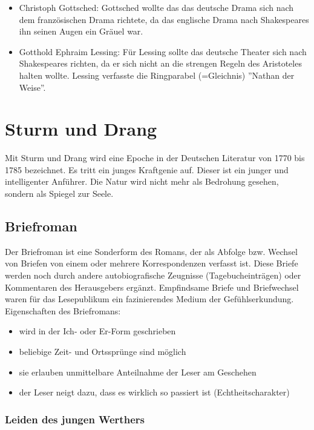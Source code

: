 \documentclass[12pt,a4paper]{article}
\begin{document}
\begin{itemize}
\item Christoph Gottsched: Gottsched wollte das das deutsche Drama sich nach dem französischen Drama richtete, da das englische Drama nach Shakespeares ihn seinen Augen ein Gräuel war. 


\item Gotthold Ephraim Lessing: Für Lessing sollte das deutsche Theater sich nach Shakespeares richten, da er sich nicht an die strengen Regeln des Aristoteles halten wollte. Lessing verfasste die Ringparabel (=Gleichnis) ''Nathan der Weise''.
\end{itemize}

\newpage

\section{Sturm und Drang}

Mit Sturm und Drang wird eine Epoche in der Deutschen Literatur von 1770 bis 1785 bezeichnet. Es tritt ein junges Kraftgenie auf. Dieser ist ein junger und intelligenter Anführer. Die Natur wird nicht mehr als Bedrohung gesehen, sondern als Spiegel zur Seele.

\subsection{Briefroman}

Der Briefroman ist eine Sonderform des Romans, der als Abfolge bzw. Wechsel von Briefen von einem oder mehrere Korrespondenzen verfasst ist. Diese Briefe werden noch durch andere autobiografische Zeugnisse (Tagebucheinträgen) oder Kommentaren des Herausgebers ergänzt. Empfindsame Briefe und Briefwechsel waren für das Lesepublikum ein fazinierendes Medium der Gefühlserkundung.\\
Eigenschaften des Briefromans:

\begin{itemize}
\item wird in der Ich- oder Er-Form geschrieben
\item beliebige Zeit- und Ortssprünge sind möglich
\item sie erlauben unmittelbare Anteilnahme der Leser am Geschehen
\item der Leser neigt dazu, dass es wirklich so passiert ist (Echtheitscharakter)
\end{itemize}

\subsubsection{Leiden des jungen Werthers}
\end{document}
